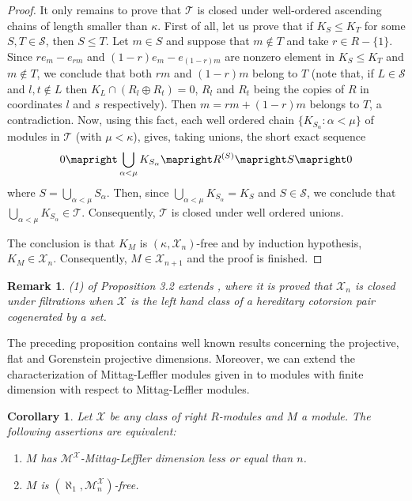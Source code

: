 \documentclass[a4paper,10pt]{amsart}
\newtheorem{corollary}[definition]{Corollary}
\newtheorem{remark}[definition]{Remark}
\begin{document}
\begin{proof}
  It only remains to prove that $\mathcal T$ is closed under
  well-ordered ascending chains of length smaller than $\kappa$. First
  of all, let us prove that if $K_S \leq K_T$ for some $S,T \in
  \mathcal S$, then $S \leq T$. Let $m \in S$ and suppose that $m
  \notin T$ and take $r \in R-\{1\}$. Since $re_m-e_{rm}$ and
  $(1-r)e_m-e_{(1-r)m}$ are nonzero element in $K_S \leq K_T$ and $m
  \notin T$, we conclude that both $rm$ and $(1-r)m$ belong to $T$
  (note that, if $L \in \mathcal S$ and $l,t \notin L$ then $K_L \cap
  (R_l\oplus R_t) = 0$, $R_l$ and $R_t$ being the copies of $R$ in
  coordinates $l$ and $s$ respectively). Then $m = rm+(1-r)m$ belongs
  to $T$, a contradiction. Now, using this fact, each well ordered chain
  $\{K_{S_\alpha}:\alpha < \mu\}$ of modules in $\mathcal T$ (with
  $\mu < \kappa$), gives, taking unions, the short exact sequence
  \begin{displaymath}
    0 \mapright \bigcup_{\alpha < \mu} K_{S_\alpha} \mapright R^{(S)}
    \mapright S \mapright 0
  \end{displaymath}
  where $S = \bigcup_{\alpha < \mu}S_\alpha$. Then, since
  $\bigcup_{\alpha < \mu}K_{S_\alpha} = K_S$ and $S \in \mathcal S$,
  we conclude that $\bigcup_{\alpha < \mu}K_{S_\alpha} \in \mathcal
  T$. Consequently, $\mathcal T$ is closed under well ordered unions.

  The conclusion is that $K_M$ is $(\kappa,\mathcal X_n)$-free and by
  induction hypothesis, $K_M \in \mathcal X_n$.  Consequently, $M \in
  \mathcal X_{n+1}$ and the proof is finished.
\end{proof}

\begin{remark}
  (1) of Proposition 3.2 extends \cite[Lemma
  2.1]{EstradaGuilIzurdiaga}, where it is proved that $\mathcal X_n$
  is closed under filtrations when $\mathcal X$ is the left hand class
  of a hereditary cotorsion pair cogenerated by a set.
\end{remark}

The preceding proposition contains well known results concerning the projective,
flat and Gorenstein projective dimensions. Moreover, we can extend the
characterization of Mittag-Leffler modules given in \cite[Theorem
2.6]{HerberaTrlifaj} to modules with finite dimension with respect to
Mittag-Leffler modules.

\begin{corollary}
  Let $\mathcal X$ be any class of right $R$-modules and $M$ a
  module. The following assertions are equivalent:
  \begin{enumerate}
  \item $M$ has $\mathcal M^{\mathcal X}$-Mittag-Leffler dimension
    less or equal than $n$.

  \item $M$ is $(\aleph_1,\mathcal M^{\mathcal X}_n)$-free.
  \end{enumerate}
\end{corollary}
\end{document}
